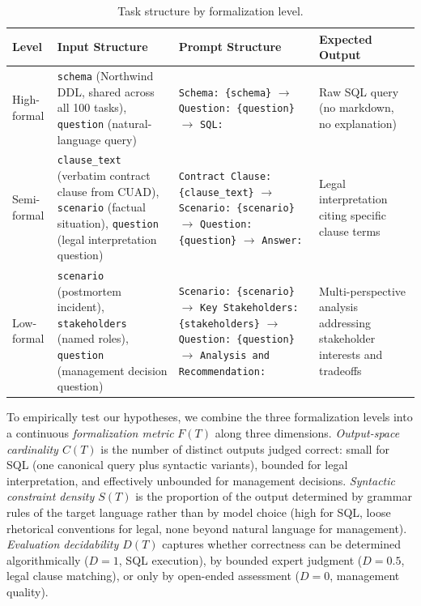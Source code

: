 \documentclass[runningheads]{llncs}
\begin{document}
\begin{table}[t]
\centering
\caption{Task structure by formalization level.}
\label{tab:task-structure}
\scriptsize
\begin{tabular}{
  >{\RaggedRight\arraybackslash}p{1.0cm}
  >{\RaggedRight\arraybackslash}p{4.2cm}
  >{\RaggedRight\arraybackslash}p{4.0cm}
  >{\RaggedRight\arraybackslash}p{2.5cm}
}
\toprule
Level & Input Structure & Prompt Structure & Expected Output \\
\midrule
High-formal &
  \texttt{schema} (Northwind DDL, shared across all 100 tasks), \texttt{question} (natural-language query) &
  \texttt{Schema: \{schema\}} $\rightarrow$ \texttt{Question: \{question\}} $\rightarrow$ \texttt{SQL:} &
  Raw SQL query (no markdown, no explanation) \\
\addlinespace
Semi-formal &
  \texttt{clause\_text} (verbatim contract clause from CUAD), \texttt{scenario} (factual situation), \texttt{question} (legal interpretation question) &
  \texttt{Contract Clause: \{clause\_text\}} $\rightarrow$ \texttt{Scenario: \{scenario\}} $\rightarrow$ \texttt{Question: \{question\}} $\rightarrow$ \texttt{Answer:} &
  Legal interpretation citing specific clause terms \\
\addlinespace
Low-formal &
  \texttt{scenario} (postmortem incident), \texttt{stakeholders} (named roles), \texttt{question} (management decision question) &
  \texttt{Scenario: \{scenario\}} $\rightarrow$ \texttt{Key Stakeholders: \{stakeholders\}} $\rightarrow$ \texttt{Question: \{question\}} $\rightarrow$ \texttt{Analysis and Recommendation:} &
  Multi-perspective analysis addressing stakeholder interests and tradeoffs \\
\bottomrule
\end{tabular}
\end{table}

To empirically test our hypotheses, we combine the three formalization levels into a continuous \textit{formalization metric} $F(T)$ along three dimensions. \textit{Output-space cardinality $C(T)$} is the number of distinct outputs judged correct: small for SQL (one canonical query plus syntactic variants), bounded for legal interpretation, and effectively unbounded for management decisions. \textit{Syntactic constraint density $S(T)$} is the proportion of the output determined by grammar rules of the target language rather than by model choice (high for SQL, loose rhetorical conventions for legal, none beyond natural language for management). \textit{Evaluation decidability $D(T)$} captures whether correctness can be determined algorithmically ($D{=}1$, SQL execution), by bounded expert judgment ($D{=}0.5$, legal clause matching), or only by open-ended assessment ($D{=}0$, management quality).
\end{document}
